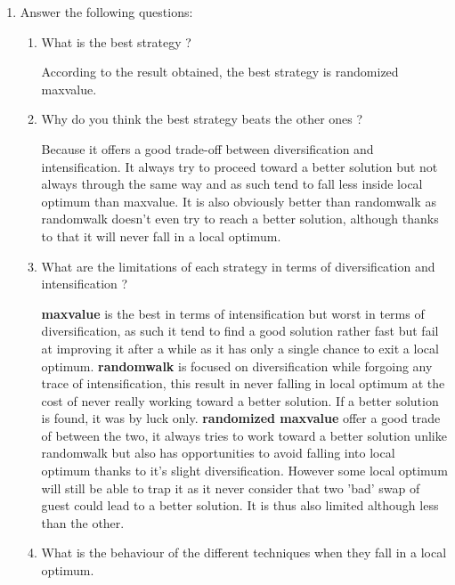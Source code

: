\begin{enumerate}
    \item Answer the following questions:
    	\begin{enumerate}
    		\item What is the best strategy ?
    			\begin{framed}
    				According to the result obtained, the best strategy is randomized maxvalue.
    			\end{framed}
    		\item Why do you think the best strategy beats the other ones ?
    			\begin{framed}
    				Because it offers a good trade-off between diversification and intensification. It always try to proceed toward a better solution but not always through the same way and as such tend to fall less inside local optimum than maxvalue. It is also obviously better than randomwalk as randomwalk doesn't even try to reach a better solution, although thanks to that it will never fall in a local optimum.
    			\end{framed}
    		\item What are the limitations of each strategy in terms of diversification and intensification ?
    			\begin{framed}
    				\textbf{maxvalue} is the best in terms of intensification but worst in terms of diversification, as such it tend to find a good solution rather fast but fail at improving it after a while as it has only a single chance to exit a local optimum. \newline \newline
    				\textbf{randomwalk} is focused on diversification while forgoing any trace of intensification, this result in never falling in local optimum at the cost of never really working toward a better solution. If a better solution is found, it was by luck only.\newline \newline
    				\textbf{randomized maxvalue} offer a good trade of between the two, it always tries to work toward a better solution unlike randomwalk but also has opportunities to avoid falling into local optimum thanks to it's slight diversification. However some local optimum will still be able to trap it as it never consider that two 'bad' swap of guest could lead to a better solution. It is thus also limited although less than the other.
    			\end{framed}
    		\item What is the behaviour of the different techniques when they fall in a local optimum.

\end{enumerate}
\end{enumerate}
